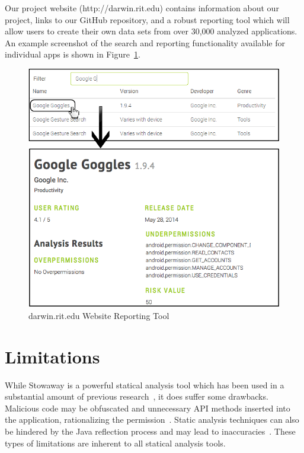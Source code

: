 \documentclass[conference]{IEEEtran}
\begin{document}
Our project website (http://darwin.rit.edu) contains information about our project, links to our GitHub repository, and a robust reporting tool which will allow users to create their own data sets from over 30,000 analyzed applications. An example screenshot of the search and reporting functionality available for individual apps is shown in Figure~\ref{fig:website1}.


\begin{figure}[ht!]
\centering
\includegraphics[width=\columnwidth, angle = 0]{images/screenshot3.png}
\caption{darwin.rit.edu Website Reporting Tool}
\label{fig:website1}
\end{figure}

\section{Limitations}
\label{sec:limitations}

While Stowaway is a powerful statical analysis tool which has been used in a substantial amount of previous research~\cite{Pearce:2012:APS:2414456.2414498,Stevens_investigatinguser,jeon2011dr}, it does suffer some drawbacks. Malicious code may be obfuscated and unnecessary API methods inserted into the application, rationalizing the permission~\cite{6698893}. Static analysis techniques can also be hindered by the Java reflection process and may lead to inaccuracies~\cite{Sridharan:2006:RCP:1133255.1134027,Tripp:2009:TET:1542476.1542486}. These types of limitations are inherent to all statical analysis tools.
\end{document}
